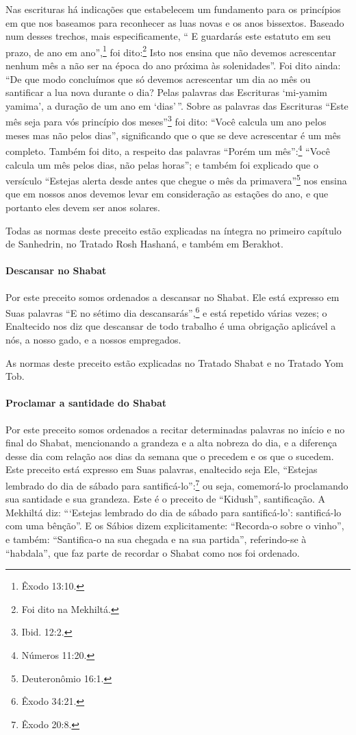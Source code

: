 Nas escrituras há indicações que estabelecem um fundamento para
os princípios em que nos baseamos para reconhecer as luas novas e os
anos bissextos. Baseado num desses trechos, mais especificamente, `` E
guardarás este estatuto em seu prazo, de ano em ano'',\footnote{Êxodo 13:10.} foi
dito:\footnote{Foi dito na Mekhiltá.} Isto nos
ensina que não devemos acrescentar nenhum mês a não ser na época do ano
próxima às solenidades''. Foi dito ainda: ``De que modo concluímos que
só devemos acrescentar um dia ao mês ou santificar a lua nova durante o dia?
Pelas palavras das Escrituras `mi-yamim yamima', a duração de um ano em
`dias'\,''. Sobre as palavras das Escrituras ``Este mês seja para vós
princípio dos meses''\footnote{Ibid. 12:2.} foi dito: ``Você calcula um ano pelos
meses mas não pelos dias'', significando que o que se deve acrescentar é
um mês completo. Também foi dito, a respeito das palavras ``Porém um
mês'':\footnote{Números 11:20.} ``Você calcula um mês pelos dias, não pelas
horas''; e também foi explicado que o versículo ``Estejas alerta desde
antes que chegue o mês da primavera''\footnote{Deuteronômio 16:1.} nos ensina que
em nossos anos devemos levar em consideração as estações do ano, e que
portanto eles devem ser anos solares.

Todas as normas deste preceito estão explicadas na íntegra no primeiro
capítulo de Sanhedrin, no Tratado Rosh Hashaná, e também em Berakhot.

\paragraph{Descansar no Shabat}

Por este preceito somos ordenados a descansar no Shabat. Ele está
expresso em Suas palavras ``E no sétimo dia descansarás'',\footnote{Êxodo 34:21.}
e está repetido várias vezes; o Enaltecido nos diz que descansar de todo
trabalho é uma obrigação aplicável a nós, a nosso gado, e a nossos
empregados.

As normas deste preceito estão explicadas no Tratado Shabat e no Tratado
Yom Tob.

\paragraph{Proclamar a santidade do Shabat}

Por este preceito somos ordenados a recitar determinadas palavras no
início e no final do Shabat, mencionando a grandeza e a alta nobreza do
dia, e a diferença desse dia com relação aos dias da semana que o
precedem e os que o sucedem. Este preceito está expresso em Suas
palavras, enaltecido seja Ele, ``Estejas lembrado do dia de sábado para
santificá-lo'':\footnote{Êxodo 20:8.} ou seja, comemorá-lo proclamando sua
santidade e sua grandeza. Este é o preceito de ``Kidush'',
santificação. A Mekhiltá diz: ```Estejas lembrado do dia de sábado para
santificá-lo': santificá-lo com uma bênção''. E os Sábios dizem
explicitamente: ``Recorda-o sobre o vinho'', e também: ``Santifica-o na
sua chegada e na sua partida'', referindo-se à ``habdala'', que faz
parte de recordar o Shabat como nos foi ordenado.


